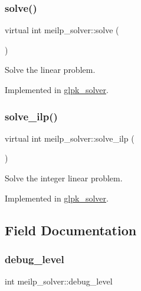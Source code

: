 \subsubsection{\texorpdfstring{solve()}{solve()}}
{\footnotesize\ttfamily virtual int meilp\+\_\+solver\+::solve (\begin{DoxyParamCaption}{ }\end{DoxyParamCaption})\hspace{0.3cm}{\ttfamily [pure virtual]}}



Solve the linear problem. 



Implemented in \hyperlink{classglpk__solver_ab9787b0a1b68144bfd68fbf95a61ad51}{glpk\+\_\+solver}.

\mbox{\label{classmeilp__solver_aec926409e78f416d3272cb8f3ef1e1c0}} 
\subsubsection{\texorpdfstring{solve\+\_\+ilp()}{solve\_ilp()}}
{\footnotesize\ttfamily virtual int meilp\+\_\+solver\+::solve\+\_\+ilp (\begin{DoxyParamCaption}{ }\end{DoxyParamCaption})\hspace{0.3cm}{\ttfamily [pure virtual]}}



Solve the integer linear problem. 



Implemented in \hyperlink{classglpk__solver_ad27b82487380811e19a1adc2628f8b07}{glpk\+\_\+solver}.



\subsection{Field Documentation}
\mbox{\label{classmeilp__solver_a9cef2504893ac9d062bfba3c5ebbf0bf}} 
\subsubsection{\texorpdfstring{debug\+\_\+level}{debug\_level}}
{\footnotesize\ttfamily int meilp\+\_\+solver\+::debug\+\_\+level\hspace{0.3cm}{\ttfamily [protected]}}



